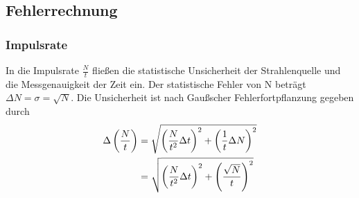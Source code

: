 \label{anhang}

\subsection{Fehlerrechnung}
\subsubsection{Impulsrate}
In die Impulsrate $ \frac{N}{t} $ fließen die statistische Unsicherheit der Strahlenquelle und die Messgenauigkeit der Zeit ein. Der statistische Fehler von N beträgt $ \Delta N = \sigma = \sqrt{N} $. Die Unsicherheit ist nach Gaußscher Fehlerfortpflanzung gegeben durch
\begin{align}
	\Delta\left(\frac{N}{t}\right) &= \sqrt{\left(\frac{N}{t^2} \Delta t\right)^2 + \left(\frac{1}{t} \Delta N\right)^2} \notag \\
		&= \sqrt{\left(\frac{N}{t^2} \Delta t\right)^2 + \left(\frac{\sqrt{N}}{t} \right)^2}
\end{align} 
%
%
